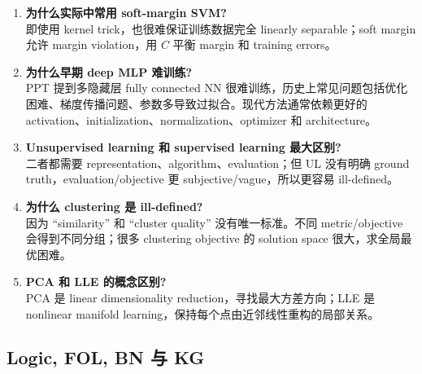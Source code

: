 \documentclass[UTF8,11pt,a4paper]{ctexart}
\begin{document}
\begin{enumerate}
\item \textbf{为什么实际中常用 soft-margin SVM?}\\
即使用 kernel trick，也很难保证训练数据完全 linearly separable；soft margin 允许 margin violation，用 $C$ 平衡 margin 和 training errors。

\item \textbf{为什么早期 deep MLP 难训练?}\\
PPT 提到多隐藏层 fully connected NN 很难训练，历史上常见问题包括优化困难、梯度传播问题、参数多导致过拟合。现代方法通常依赖更好的 activation、initialization、normalization、optimizer 和 architecture。

\item \textbf{Unsupervised learning 和 supervised learning 最大区别?}\\
二者都需要 representation、algorithm、evaluation；但 UL 没有明确 ground truth，evaluation/objective 更 subjective/vague，所以更容易 ill-defined。

\item \textbf{为什么 clustering 是 ill-defined?}\\
因为 ``similarity'' 和 ``cluster quality'' 没有唯一标准。不同 metric/objective 会得到不同分组；很多 clustering objective 的 solution space 很大，求全局最优困难。

\item \textbf{PCA 和 LLE 的概念区别?}\\
PCA 是 linear dimensionality reduction，寻找最大方差方向；LLE 是 nonlinear manifold learning，保持每个点由近邻线性重构的局部关系。
\end{enumerate}

\subsection{Logic, FOL, BN 与 KG}
\end{document}
